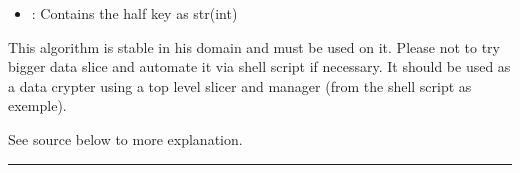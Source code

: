 \documentclass[letterpaper,10pt,english]{sphinxmanual}
\begin{document}
\begin{description}
\begin{itemize}
\begin{description}
\begin{itemize}
\item {} 
\sphinxAtStartPar
{} : Contains the half key as str(int)

\end{itemize}

\end{description}

\end{itemize}

\end{description}

\sphinxAtStartPar
This algorithm is stable in his domain and must be used on it.
Please not to try bigger data slice and automate it via shell script if necessary.
It should be used as a data crypter using a top level slicer and manager (from the shell script as exemple).

\sphinxAtStartPar
See source below to more explanation.


\bigskip\hrule\bigskip
\end{document}
